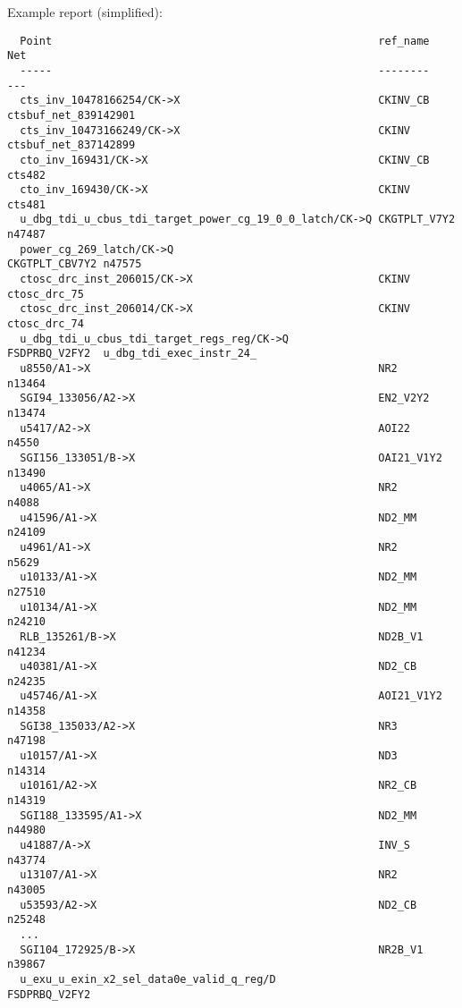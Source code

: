 \documentclass[professionalfonts]{beamer}
\begin{document}
\begin{frame}[fragile]
  Example report (simplified):
  \tiny
  \begin{verbatim}
  Point                                                   ref_name       Net
  -----                                                   --------       ---
  cts_inv_10478166254/CK->X                               CKINV_CB       ctsbuf_net_839142901
  cts_inv_10473166249/CK->X                               CKINV          ctsbuf_net_837142899
  cto_inv_169431/CK->X                                    CKINV_CB       cts482
  cto_inv_169430/CK->X                                    CKINV          cts481
  u_dbg_tdi_u_cbus_tdi_target_power_cg_19_0_0_latch/CK->Q CKGTPLT_V7Y2   n47487
  power_cg_269_latch/CK->Q                                CKGTPLT_CBV7Y2 n47575
  ctosc_drc_inst_206015/CK->X                             CKINV          ctosc_drc_75
  ctosc_drc_inst_206014/CK->X                             CKINV          ctosc_drc_74
  u_dbg_tdi_u_cbus_tdi_target_regs_reg/CK->Q              FSDPRBQ_V2FY2  u_dbg_tdi_exec_instr_24_
  u8550/A1->X                                             NR2            n13464
  SGI94_133056/A2->X                                      EN2_V2Y2       n13474
  u5417/A2->X                                             AOI22          n4550
  SGI156_133051/B->X                                      OAI21_V1Y2     n13490
  u4065/A1->X                                             NR2            n4088
  u41596/A1->X                                            ND2_MM         n24109
  u4961/A1->X                                             NR2            n5629
  u10133/A1->X                                            ND2_MM         n27510
  u10134/A1->X                                            ND2_MM         n24210
  RLB_135261/B->X                                         ND2B_V1        n41234
  u40381/A1->X                                            ND2_CB         n24235
  u45746/A1->X                                            AOI21_V1Y2     n14358
  SGI38_135033/A2->X                                      NR3            n47198
  u10157/A1->X                                            ND3            n14314
  u10161/A2->X                                            NR2_CB         n14319
  SGI188_133595/A1->X                                     ND2_MM         n44980
  u41887/A->X                                             INV_S          n43774
  u13107/A1->X                                            NR2            n43005
  u53593/A2->X                                            ND2_CB         n25248
  ...
  SGI104_172925/B->X                                      NR2B_V1        n39867
  u_exu_u_exin_x2_sel_data0e_valid_q_reg/D                FSDPRBQ_V2FY2
  \end{verbatim}
\end{frame}
\end{document}
